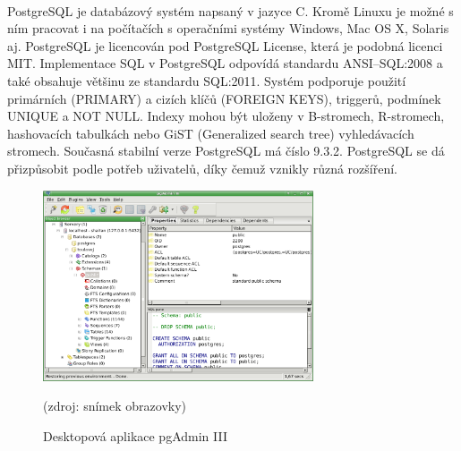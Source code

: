 \documentclass[11pt,a4paper,titlepage,oneside]{book}
\begin{document}
		\paragraph{}PostgreSQL je databázový systém napsaný v jazyce C. Kromě Linuxu je možné s ním pracovat i na počítačích s operačními systémy Windows, Mac OS X, Solaris aj. PostgreSQL je licencován pod PostgreSQL License, která je podobná licenci MIT.  Implementace SQL v PostgreSQL  odpovídá standardu ANSI--SQL:2008\cite{postgresql} a také obsahuje většinu ze standardu SQL:2011\cite{wiki_postgresql}. Systém podporuje použití primárních (PRIMARY) a cizích klíčů (FOREIGN KEYS), triggerů, podmínek UNIQUE a NOT NULL. Indexy mohou být uloženy v B-stromech, R-stromech, hashovacích tabulkách nebo GiST (Generalized search tree) vyhledávacích stromech. Současná stabilní verze PostgreSQL má číslo 9.3.2. PostgreSQL se dá přizpůsobit podle potřeb uživatelů, díky čemuž vznikly různá rozšíření. 
		\begin{figure}[!h]
			\begin{center}
				\includegraphics[width=8cm]{obrazky/pgadmin3.png}
				\caption{Desktopová aplikace pgAdmin III}
				\label{fig:pgadmin}
				(zdroj: snímek obrazovky)
			\end{center}
		\end{figure}
\end{document}
